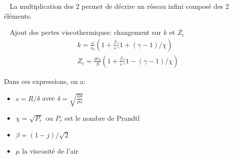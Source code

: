 \documentclass[12pt,notes=show]{beamer} %
\begin{document}
\begin{frame}{~}
La multiplication des 2 permet de décrire un réseau infini composé des 2 éléments.
\end{frame}




\begin{frame}{~}
Ajout des pertes viscothermiques: changement sur $k$ et $Z_c$
\begin{eqnarray*}
 k =  \frac{\omega}{c_0} \left( 1 + \frac{\beta}{s}(1+(\gamma-1)/ \chi \right) \\
 Z_c =  \frac{\rho c_0}{S} \left( 1 + \frac{\beta}{s}(1-(\gamma-1)/ \chi \right) 
\end{eqnarray*}

Dans ces expressions, on a:
\begin{itemize}
 \item  $s=R/ \delta$ avec $\delta = \sqrt{\frac{2 \mu}{\rho \omega}}$
 \item  $\chi = \sqrt{P_r}$ ou $P_r$ est le nombre de Prandtl
 \item $\beta = (1-j)/\sqrt{2}$ 
 \item $\mu$ la viscosité de l'air
\end{itemize}
\end{frame}
\end{document}
